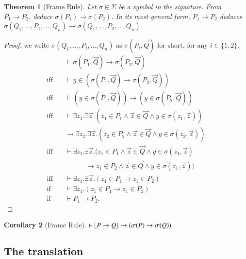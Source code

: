 \documentclass{article}
\theoremstyle{plain}
\newtheorem{thm}{Theorem}
\newtheorem{cor}[thm]{Corollary}
\DeclarePairedDelimiter\floor{\lfloor}{\rfloor}
\def\MLFOL{\text{\small ML2FOL}}
\begin{document}
\begin{thm} [Frame Rule]
	Let $\sigma \in \Sigma$ be a symbol in the signature. From $P_1 \to P_2$, deduce $\sigma(P_1) \to \sigma(P_2)$. In its most general form, $P_1 \to P_2$ deduces $\sigma(Q_1,\dots,P_1,\dots,Q_n) \to \sigma(Q_1,\dots, P_2, \dots, Q_n)$.
\end{thm}
\begin{proof}
	we write $\sigma(Q_1,\dots,P_i,\dots,Q_n)$ as $\sigma(P_i,\vec{Q})$ for short, for any $i \in \{1,2\}$.
	\begin{align*}
	&\vdash \sigma(P_1, \vec{Q}) \to \sigma(P_2,\vec{Q}) \\
	\text{iff} \quad &\vdash y \in (\sigma(P_1, \vec{Q}) \to \sigma(P_2,\vec{Q})) \\
	\text{iff} \quad &\vdash (y \in \sigma(P_1, \vec{Q})) \to (y \in \sigma(P_2, \vec{Q})) \\
	\text{iff} \quad &\vdash \exists z_1 . \exists \vec{z} . (z_1 \in P_1 \wedge \vec{z} \in \vec{Q} \wedge y \in \sigma(z_1, \vec{z})) \\
	&\to \exists z_2 . \exists \vec{z} . (z_2 \in P_2 \wedge \vec{z} \in \vec{Q} \wedge y \in \sigma(z_2, \vec{z})) \\
	\text{iff} \quad &\vdash \exists z_1 . \exists \vec{z} . (z_1 \in P_1 \wedge \vec{z} \in \vec{Q} \wedge y \in \sigma(z_1, \vec{z}) \\
	 &\quad \quad \quad \to z_1 \in P_2 \wedge \vec{z} \in \vec{Q} \wedge y \in \sigma(z_1, \vec{z})) \\
	\text{iff} \quad &\vdash \exists z_1. \exists \vec{z} . (z_1 \in P_1 \to z_1 \in P_2) \\
	\text{if} \quad &\vdash \exists z_1 .  (z_1 \in P_1 \to z_1 \in P_2) \\
	\text{if} \quad &\vdash P_1 \to P_2.
	\end{align*}
\end{proof}
\begin{cor} [Frame Rule]
	$\vdash \floor*{P \to Q} \to (\sigma(P) \to \sigma(Q))$
\end{cor}

\subsection{The {\MLFOL} translation}
\end{document}
